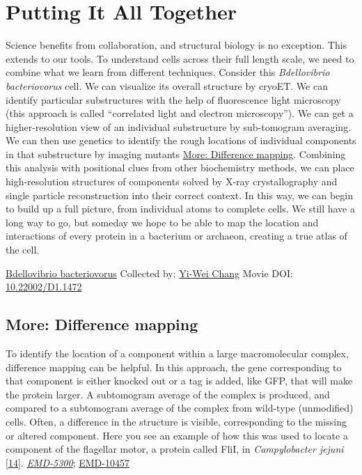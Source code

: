 \documentclass[]{tufte-book}
\begin{document}
\hypertarget{putting-it-all-together}{%
\section{Putting It All Together}\label{putting-it-all-together}}

Science benefits from collaboration, and structural biology is no exception. This extends to our tools. To understand cells across their full length scale, we need to combine what we learn from different techniques. Consider this \emph{Bdellovibrio bacteriovorus} cell. We can visualize its overall structure by cryoET. We can identify particular substructures with the help of fluorescence light microscopy (this approach is called ``correlated light and electron microscopy''). We can get a higher-resolution view of an individual substructure by sub-tomogram averaging. We can then use genetics to identify the rough locations of individual components in that substructure by imaging mutants \protect\hyperlink{Difference_mapping}{More: Difference mapping}. Combining this analysis with positional clues from other biochemistry methods, we can place high-resolution structures of components solved by X-ray crystallography and single particle reconstruction into their correct context. In this way, we can begin to build up a full picture, from individual atoms to complete cells. We still have a long way to go, but someday we hope to be able to map the location and interactions of every protein in a bacterium or archaeon, creating a true atlas of the cell.



\hypertarget{htmlwidget-e37ef08c5193673bcc0c}{}

\label{fig:1-10}\protect\hyperlink{tree}{Bdellovibrio bacteriovorus} Collected by: \protect\hyperlink{yi-wei_chang}{Yi-Wei Chang} Movie DOI: \href{https://doi.org/10.22002/D1.1472}{10.22002/D1.1472}

\hypertarget{Difference_mapping}{%
\subsection*{More: Difference mapping}\label{Difference_mapping}}

To identify the location of a component within a large macromolecular complex, difference mapping can be helpful. In this approach, the gene corresponding to that component is either knocked out or a tag is added, like GFP, that will make the protein larger. A subtomogram average of the complex is produced, and compared to a subtomogram average of the complex from wild-type (unmodified) cells. Often, a difference in the structure is visible, corresponding to the missing or altered component. Here you see an example of how this was used to locate a component of the flagellar motor, a protein called FliI, in \emph{Campylobacter jejuni} {[}\protect\hyperlink{ref-henderson2020}{14}{]}. \href{https://www.ebi.ac.uk/pdbe/entry/emdb/emd-5300}{\emph{EMD-5300}}; \href{https://www.ebi.ac.uk/pdbe/entry/emdb/emd-10457}{EMD-10457}
\end{document}
